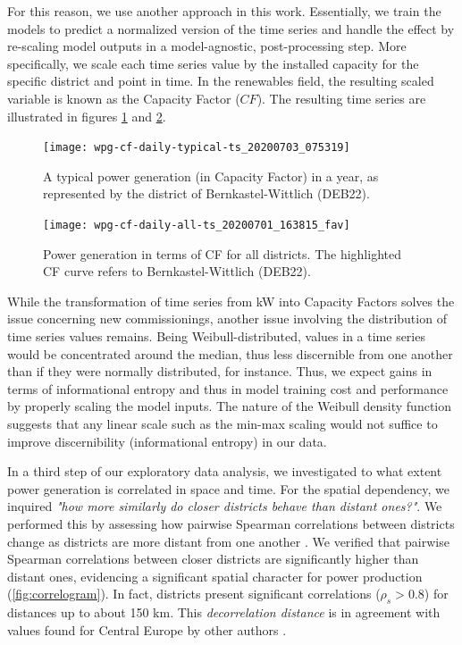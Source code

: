 For this reason, we use another approach in this work.
Essentially, we train the models to predict a normalized version of the time series and handle the effect by re-scaling model outputs in a model-agnostic, post-processing step.
More specifically, we scale each time series value by the installed capacity for the specific district and point in time.
In the renewables field, the resulting scaled variable is known as the Capacity Factor ($CF$).
The resulting time series are illustrated in figures \ref{fig:deb22_production_2015_cf} and \ref{fig:all_cf}.

\begin{figure}[H]%
	\centering
    \caption{A typical power generation (in Capacity Factor) in a year, as represented by the district of Bernkastel-Wittlich (DEB22).}
    \texttt{[image: wpg-cf-daily-typical-ts\_20200703\_075319]}
	\label{fig:deb22_production_2015_cf}
\end{figure}

\begin{figure}[H]%
	\centering
    \caption{Power generation in terms of CF for all districts. The highlighted CF curve refers to Bernkastel-Wittlich (DEB22).}
    \texttt{[image: wpg-cf-daily-all-ts\_20200701\_163815\_fav]}
	\label{fig:all_cf}
\end{figure}

While the transformation of time series from kW into Capacity Factors solves the issue concerning new commissionings, another issue involving the distribution of time series values remains.
Being Weibull-distributed, values in a time series would be concentrated around the median, thus less discernible from one another than if they were normally distributed, for instance.
Thus, we expect gains in terms of informational entropy and thus in model training cost and performance by properly scaling the model inputs.
The nature of the Weibull density function suggests that any linear scale such as the min-max scaling would not suffice to improve discernibility (informational entropy) in our data.

In a third step of our exploratory data analysis, we investigated to what extent power generation is correlated in space and time.
For the spatial dependency, we inquired \textit{"how more similarly do closer districts behave than distant ones?"}.
We performed this by assessing how pairwise Spearman correlations between districts change as districts are more distant from one another \cite{engeland2017variability}.
We verified that pairwise Spearman correlations between closer districts are significantly higher than distant ones, evidencing a significant spatial character for power production (\ref{fig:correlogram}).
In fact, districts present significant correlations ($\rho_s>0.8$) for distances up to about 150 km.
This \textit{decorrelation distance} is in agreement with values found for Central Europe by other authors \cite{engeland2017variability}.

